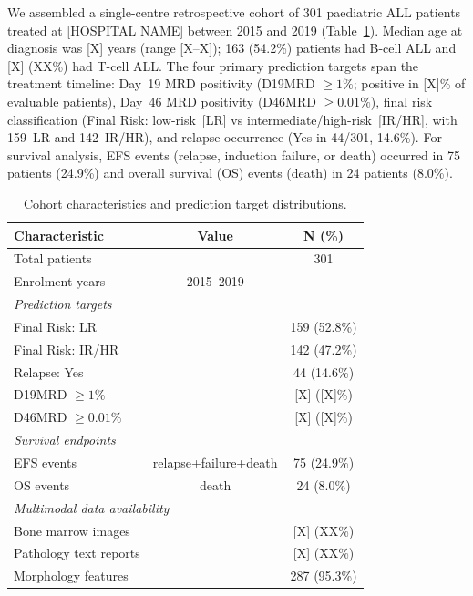 \documentclass[pdflatex,sn-nature]{sn-jnl}
\begin{document}
We assembled a single-centre retrospective cohort of 301 paediatric
ALL patients treated at [HOSPITAL NAME] between 2015 and 2019
(Table~\ref{tab:cohort}).
Median age at diagnosis was [X] years (range [X--X]); 163 (54.2\%)
patients had B-cell ALL and [X] (XX\%) had T-cell ALL.
The four primary prediction targets span the treatment timeline:
Day~19 MRD positivity (D19MRD $\geq 1\%$; positive in [X]\% of
evaluable patients), Day~46 MRD positivity (D46MRD $\geq 0.01\%$),
final risk classification (Final Risk: low-risk~[LR] vs
intermediate/high-risk~[IR/HR], with 159~LR and 142~IR/HR), and
relapse occurrence (Yes in 44/301, 14.6\%).
For survival analysis, EFS events (relapse, induction failure, or
death) occurred in 75 patients (24.9\%) and overall survival (OS)
events (death) in 24 patients (8.0\%).

\begin{table}[ht]
\caption{Cohort characteristics and prediction target distributions.}
\label{tab:cohort}
\centering
\small
\begin{tabular}{lcc}
\toprule
\textbf{Characteristic} & \textbf{Value} & \textbf{N (\%)} \\
\midrule
Total patients & & 301 \\
Enrolment years & 2015--2019 & \\
\midrule
\multicolumn{3}{l}{\textit{Prediction targets}} \\
Final Risk: LR & & 159 (52.8\%) \\
Final Risk: IR/HR & & 142 (47.2\%) \\
Relapse: Yes & & 44 (14.6\%) \\
D19MRD $\geq 1\%$ & & [X] ([X]\%) \\
D46MRD $\geq 0.01\%$ & & [X] ([X]\%) \\
\midrule
\multicolumn{3}{l}{\textit{Survival endpoints}} \\
EFS events & relapse+failure+death & 75 (24.9\%) \\
OS events & death & 24 (8.0\%) \\
\midrule
\multicolumn{3}{l}{\textit{Multimodal data availability}} \\
Bone marrow images & & [X] (XX\%) \\
Pathology text reports & & [X] (XX\%) \\
Morphology features & & 287 (95.3\%) \\
\bottomrule
\end{tabular}
\end{table}
\end{document}
